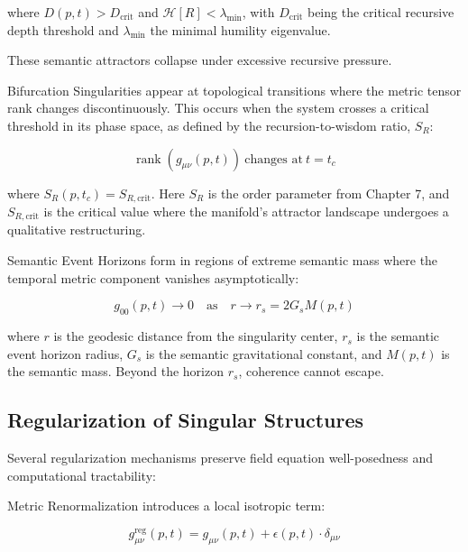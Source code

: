 where \(D(p, t) > D_{\text{crit}}\) and \(\mathcal{H}[R] < \lambda_{\text{min}}\), with \(D_{\text{crit}}\) being the critical recursive depth threshold and \(\lambda_{\text{min}}\) the minimal humility eigenvalue.

These semantic attractors collapse under excessive recursive pressure.

Bifurcation Singularities appear at topological transitions where the metric tensor rank changes discontinuously. This occurs when the system crosses a critical threshold in its phase space, as defined by the recursion-to-wisdom ratio, \(S_R\):

\begin{equation}
\operatorname{rank}(g_{\mu\nu}(p, t)) \ \text{changes at} \ t = t_c
\end{equation}

where \(S_R(p, t_c) = S_{R, \text{crit}}\). Here \(S_R\) is the order parameter from Chapter 7, and \(S_{R, \text{crit}}\) is the critical value where the manifold's attractor landscape undergoes a qualitative restructuring.

Semantic Event Horizons form in regions of extreme semantic mass where the temporal metric component vanishes asymptotically:

\begin{equation}
g_{00}(p, t) \to 0 \quad \text{as} \quad r \to r_s = 2G_s M(p, t)
\end{equation}

where \(r\) is the geodesic distance from the singularity center, \(r_s\) is the semantic event horizon radius, \(G_s\) is the semantic gravitational constant, and \(M(p, t)\) is the semantic mass. Beyond the horizon \(r_s\), coherence cannot escape.


\subsection{Regularization of Singular Structures}
\label{12.2.1:regularization_of_singular_structures}

Several regularization mechanisms preserve field equation well-posedness and computational tractability:

Metric Renormalization introduces a local isotropic term:

\begin{equation}
g_{\mu\nu}^{\text{reg}}(p, t) = g_{\mu\nu}(p, t) + \epsilon(p, t) \cdot \delta_{\mu\nu}
\end{equation}

